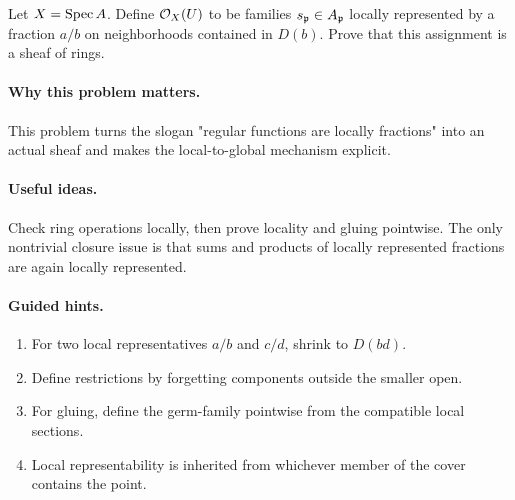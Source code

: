 \begin{problem}\label{prob:vi17-p01}
Let $X=\operatorname{Spec} A$.  Define $\mathcal O_X(U)$ to be families $s_{\mathfrak p}\in A_{\mathfrak p}$ locally represented by a fraction $a/b$ on neighborhoods contained in $D(b)$.  Prove that this assignment is a sheaf of rings.
\end{problem}

\ifdefined\FullProblemDossiers
\paragraph{Why this problem matters.}
This problem turns the slogan "regular functions are locally fractions" into an actual sheaf and makes the local-to-global mechanism explicit.

\paragraph{Useful ideas.}
Check ring operations locally, then prove locality and gluing pointwise.  The only nontrivial closure issue is that sums and products of locally represented fractions are again locally represented.

\paragraph{Guided hints.}
\begin{enumerate}
\item For two local representatives $a/b$ and $c/d$, shrink to $D(bd)$.
\item Define restrictions by forgetting components outside the smaller open.
\item For gluing, define the germ-family pointwise from the compatible local sections.
\item Local representability is inherited from whichever member of the cover contains the point.
\end{enumerate}

